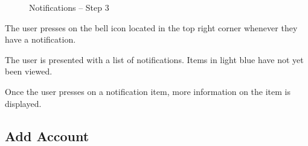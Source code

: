 \begin{figure}
\begin{minipage}{4.6cm}
    \caption{Notifications -- Step 3}
    \label{fig:ui_not_step3}
  \end{minipage}
\end{figure}

\begin{minipage}{\textwidth}
  \centering
  \begin{minipage}[t]{4.6cm}
    \vspace{0pt}
    \centering
    \begin{minipage}{4.4cm}
      The user presses on the bell icon located in the top right corner whenever they have a notification.
    \end{minipage}
  \end{minipage}
  \begin{minipage}[t]{4.6cm}
    \vspace{0pt}
    \centering
    \begin{minipage}{4.4cm}
      The user is presented with a list of notifications. Items in light blue have not yet been viewed.
    \end{minipage}
  \end{minipage}
  \begin{minipage}[t]{4.6cm}
    \vspace{0pt}
    \centering
    \begin{minipage}{4.4cm}
      Once the user presses on a notification item, more information on the item is displayed.
    \end{minipage}
  \end{minipage}
\end{minipage}

\clearpage

\subsection{Add Account}

